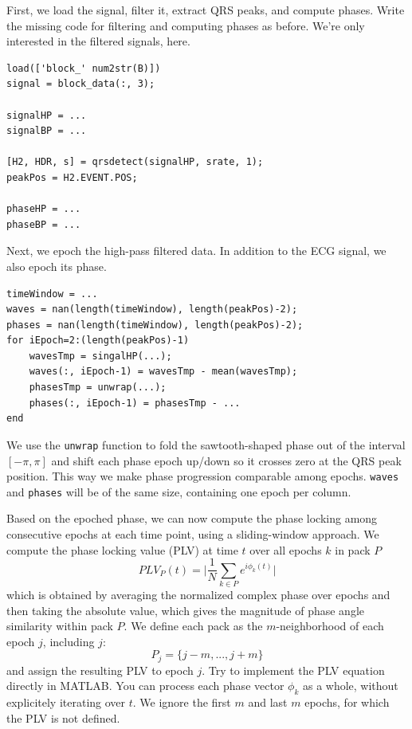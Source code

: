 \documentclass[10pt,a4paper,notitlepage]{report}
\begin{document}
First, we load the signal, filter it, extract QRS peaks, and compute phases. Write the missing code for filtering and computing phases as before. We're only interested in the filtered signals, here.

\begin{verbatim}
load(['block_' num2str(B)])
signal = block_data(:, 3);

signalHP = ...
signalBP = ...

[H2, HDR, s] = qrsdetect(signalHP, srate, 1);
peakPos = H2.EVENT.POS;

phaseHP = ...
phaseBP = ...
\end{verbatim}

Next, we epoch the high-pass filtered data. In addition to the ECG signal, we also epoch its phase.

\begin{verbatim}
timeWindow = ...
waves = nan(length(timeWindow), length(peakPos)-2);
phases = nan(length(timeWindow), length(peakPos)-2);
for iEpoch=2:(length(peakPos)-1)
    wavesTmp = singalHP(...);
    waves(:, iEpoch-1) = wavesTmp - mean(wavesTmp);
    phasesTmp = unwrap(...);
    phases(:, iEpoch-1) = phasesTmp - ...
end
\end{verbatim}

We use the \texttt{unwrap} function to fold the sawtooth-shaped phase out of the interval $[-\pi, \pi]$ and shift each phase epoch up/down so it crosses zero at the QRS peak position. This way we make phase progression comparable among epochs. \texttt{waves} and \texttt{phases} will be of the same size, containing one epoch per column.

Based on the epoched phase, we can now compute the phase locking among consecutive epochs at each time point, using a sliding-window approach. We compute the phase locking value (PLV) at time $t$ over all epochs $k$ in pack $P$
\begin{equation*}
PLV_P(t) = \lvert \frac{1}{N}\sum_{k\in P}e^{i\phi_k(t)} \rvert
\end{equation*}
which is obtained by averaging the normalized complex phase over epochs and then taking the absolute value, which gives the magnitude of phase angle similarity within pack $P$. We define each pack as the $m$-neighborhood of each epoch $j$, including $j$:
\begin{equation*}
P_j = \lbrace j-m, ..., j+m\rbrace
\end{equation*}
and assign the resulting PLV to epoch $j$. Try to implement the PLV equation directly in MATLAB. You can process each phase vector $\phi_k$ as a whole, without explicitely iterating over $t$. We ignore the first $m$ and last $m$ epochs, for which the PLV is not defined.
\end{document}
